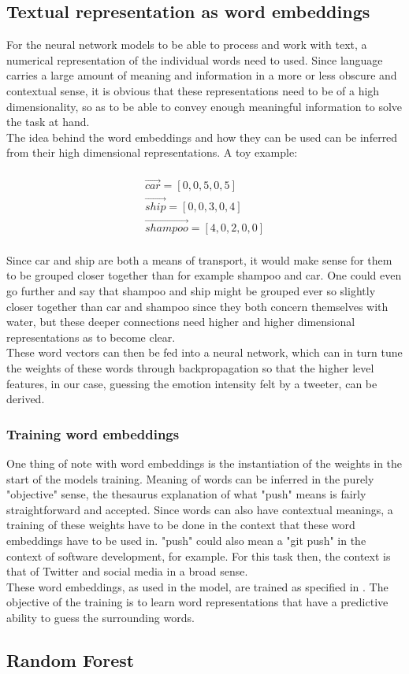 \subsection{Textual representation as word embeddings}
For the neural network models to be able to process and work with text, a numerical representation of the individual words need to used. Since language carries a large amount of meaning and information in a more or less obscure and contextual sense, it is obvious that these representations need to be of a high dimensionality, so as to be able to convey enough meaningful information to solve the task at hand.\\
The idea behind the word embeddings and how they can be used can be inferred from their high dimensional representations. A toy example:\\
\\
\begin{equation}
\begin{aligned}
\vec{car} = [0,0,5,0,5]\\
\vec{ship} = [0,0,3,0,4]\\
\vec{shampoo} = [4,0,2,0,0]
\end{aligned}
\end{equation}\\
Since car and ship are both a means of transport, it would make sense for them to be grouped closer together than for example shampoo and car. One could even go further and say that shampoo and ship might be grouped ever so slightly closer together than car and shampoo since they both concern themselves with water, but these deeper connections need higher and higher dimensional representations as to become clear.\\
These word vectors can then be fed into a neural network, which can in turn tune the weights of these words through backpropagation so that the higher level features, in our case, guessing the emotion intensity felt by a tweeter, can be derived.

\subsubsection{Training word embeddings}
One thing of note with word embeddings is the instantiation of the weights in the start of the models training. Meaning of words can be inferred in the purely "objective" sense, the thesaurus explanation of what "push" means is fairly straightforward and accepted. Since words can also have contextual meanings, a training of these weights have to be done in the context that these word embeddings have to be used in. "push" could also mean a "git push" in the context of software development, for example. For this task then, the context is that of Twitter and social media in a broad sense.\\
These word embeddings, as used in the model, are trained as specified in \cite{mikolov}. The objective of the training is to learn word representations that have a predictive ability to guess the surrounding words. 

\subsection{Random Forest}